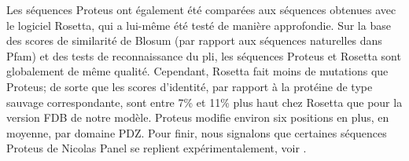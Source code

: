 Les séquences Proteus ont également été comparées aux séquences obtenues avec le logiciel Rosetta, qui a lui-même été testé de manière approfondie. Sur la base des scores de similarité de Blosum (par rapport aux séquences naturelles dans Pfam) et des tests de reconnaissance du pli, les séquences Proteus et Rosetta sont globalement de même qualité. Cependant, Rosetta fait moins de mutations que Proteus; de sorte que les scores d'identité, par rapport à la protéine de type sauvage correspondante, sont entre 7\% et 11\% plus haut chez Rosetta que pour la version FDB de notre modèle. Proteus modifie environ six positions en plus, en moyenne, par domaine PDZ. Pour finir, nous signalons que certaines séquences Proteus de Nicolas Panel se replient expérimentalement, voir \cite{Panel17}.
 
   
